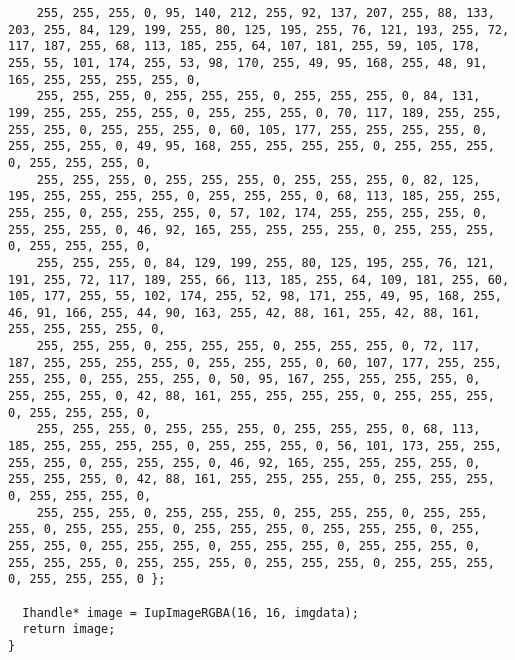 \documentclass{ctexart}
\begin{document}
\begin{lstlisting}
    255, 255, 255, 0, 95, 140, 212, 255, 92, 137, 207, 255, 88, 133, 203, 255, 84, 129, 199, 255, 80, 125, 195, 255, 76, 121, 193, 255, 72, 117, 187, 255, 68, 113, 185, 255, 64, 107, 181, 255, 59, 105, 178, 255, 55, 101, 174, 255, 53, 98, 170, 255, 49, 95, 168, 255, 48, 91, 165, 255, 255, 255, 255, 0,
    255, 255, 255, 0, 255, 255, 255, 0, 255, 255, 255, 0, 84, 131, 199, 255, 255, 255, 255, 0, 255, 255, 255, 0, 70, 117, 189, 255, 255, 255, 255, 0, 255, 255, 255, 0, 60, 105, 177, 255, 255, 255, 255, 0, 255, 255, 255, 0, 49, 95, 168, 255, 255, 255, 255, 0, 255, 255, 255, 0, 255, 255, 255, 0,
    255, 255, 255, 0, 255, 255, 255, 0, 255, 255, 255, 0, 82, 125, 195, 255, 255, 255, 255, 0, 255, 255, 255, 0, 68, 113, 185, 255, 255, 255, 255, 0, 255, 255, 255, 0, 57, 102, 174, 255, 255, 255, 255, 0, 255, 255, 255, 0, 46, 92, 165, 255, 255, 255, 255, 0, 255, 255, 255, 0, 255, 255, 255, 0,
    255, 255, 255, 0, 84, 129, 199, 255, 80, 125, 195, 255, 76, 121, 191, 255, 72, 117, 189, 255, 66, 113, 185, 255, 64, 109, 181, 255, 60, 105, 177, 255, 55, 102, 174, 255, 52, 98, 171, 255, 49, 95, 168, 255, 46, 91, 166, 255, 44, 90, 163, 255, 42, 88, 161, 255, 42, 88, 161, 255, 255, 255, 255, 0,
    255, 255, 255, 0, 255, 255, 255, 0, 255, 255, 255, 0, 72, 117, 187, 255, 255, 255, 255, 0, 255, 255, 255, 0, 60, 107, 177, 255, 255, 255, 255, 0, 255, 255, 255, 0, 50, 95, 167, 255, 255, 255, 255, 0, 255, 255, 255, 0, 42, 88, 161, 255, 255, 255, 255, 0, 255, 255, 255, 0, 255, 255, 255, 0,
    255, 255, 255, 0, 255, 255, 255, 0, 255, 255, 255, 0, 68, 113, 185, 255, 255, 255, 255, 0, 255, 255, 255, 0, 56, 101, 173, 255, 255, 255, 255, 0, 255, 255, 255, 0, 46, 92, 165, 255, 255, 255, 255, 0, 255, 255, 255, 0, 42, 88, 161, 255, 255, 255, 255, 0, 255, 255, 255, 0, 255, 255, 255, 0,
    255, 255, 255, 0, 255, 255, 255, 0, 255, 255, 255, 0, 255, 255, 255, 0, 255, 255, 255, 0, 255, 255, 255, 0, 255, 255, 255, 0, 255, 255, 255, 0, 255, 255, 255, 0, 255, 255, 255, 0, 255, 255, 255, 0, 255, 255, 255, 0, 255, 255, 255, 0, 255, 255, 255, 0, 255, 255, 255, 0, 255, 255, 255, 0 };

  Ihandle* image = IupImageRGBA(16, 16, imgdata);
  return image;
}


\end{lstlisting}
\end{document}
